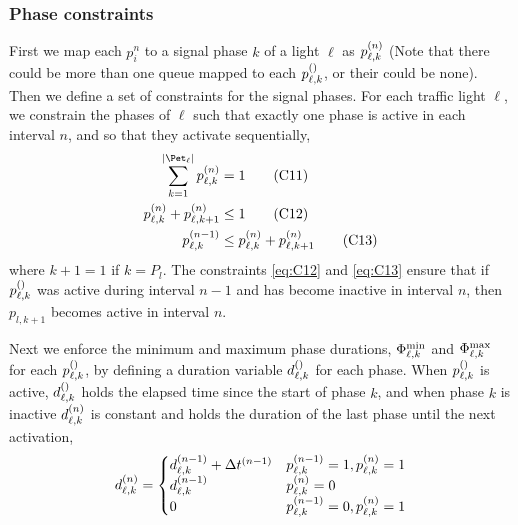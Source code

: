 \subsubsection{Phase constraints}
First we map each $p_i^n$ to a signal phase $k$ of a light $\ell$ as $\p{\ell}{k}$ (Note that there could be more than one queue mapped to each $\p[]{\ell}{k}$, or their could be none). Then we define a set of constraints for the signal phases. For each traffic light $\ell$, we constrain the phases of $\ell$ such that exactly one phase is active in each interval $n$, and so that they activate sequentially,
\begin{align}
\sum\limits_{k=1}^{\Pn} \p{\ell}{k} &= 1\tag{C11}\label{eq:C11}\\
\p{\ell}{k} + \p{\ell}{k+1} &\le 1\tag{C12}\label{eq:C12}\\
\p[n-1]{\ell}{k} &\le \p{\ell}{k} + \p{\ell}{k+1}\tag{C13}\label{eq:C13}
\end{align}
where $k+1=1$ if $k=P_l$. The constraints \ref{eq:C12} and \ref{eq:C13} ensure that if $\p[]{\ell}{k}$ was active during interval $n-1$ and has become inactive in interval $n$, then $p_{l,k+1}$ becomes active in interval $n$.

Next we enforce the minimum and maximum phase durations, $\PTMIN{\ell}{k}$ and $\PTMAX{\ell}{k}$ for each $\p[]{\ell}{k}$, by defining a duration variable $\pd[]{\ell}{k}$ for each phase. When $\p[]{\ell}{k}$ is active, $\pd[]{\ell}{k}$ holds the elapsed time since the start of phase $k$, and when phase $k$ is inactive $\pd{\ell}{k}$ is constant and holds the duration of the last phase until the next activation,
\begin{equation}
\pd{\ell}{k} = 
\begin{cases}
\pd[n-1]{\ell}{k} + \DT[n-1] & \p[n-1]{\ell}{k}=1,\p{\ell}{k}=1\\
\pd[n-1]{\ell}{k} & \p{\ell}{k}=0\\
0 & \p[n-1]{\ell}{k}=0,\p{\ell}{k}=1
\end{cases}
\end{equation}

